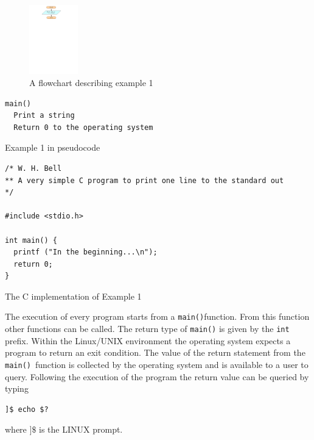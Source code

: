 \documentclass[11pt]{scrartcl}
\def\main{\texttt{main()}}
\def\linux{Linux}
\begin{document}
\begin{figure}[h]
\begin{center}
\includegraphics[height=3cm]{figures/ex1}
\caption{A flowchart describing example 1
\label{figure:flowchart_ex1}}
\end{center}
\end{figure}

\begin{pseudocode}[h]
\begin{verbatim}
main()
  Print a string
  Return 0 to the operating system
\end{verbatim}
\caption{Example 1 in pseudocode \label{pseudo:ex1}}
\end{pseudocode}

\begin{program}[H]
\begin{lstlisting}
/* W. H. Bell
** A very simple C program to print one line to the standard out
*/

#include <stdio.h>

int main() {
  printf ("In the beginning...\n");
  return 0;
}
\end{lstlisting}
\caption{The C implementation of Example 1 \label{listing:ex1}}
\end{program}

The execution of every program starts from a \main function.  From
this function other functions can be called.  The return type of \main
is given by the \texttt{int} prefix.  Within the \linux/UNIX
environment the operating system expects a program to return an exit
condition.  The value of the return statement from the \main\ function
is collected by the operating system and is available to a user to
query.  Following the execution of the program the return value can
be queried by typing
\begin{verbatim}
]$ echo $?
\end{verbatim}
where \texttt{$]\$$} is the LINUX prompt.
\end{document}
